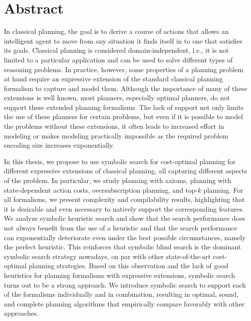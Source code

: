 \thispagestyle{empty}
\chapter*{Abstract}

In classical planning, the goal is to derive a course of actions that allows an intelligent agent to move from any situation it finds itself in to one that satisfies its goals.
Classical planning is considered domain-independent, i.e., it is not limited to a particular application and can be used to solve different types of reasoning problems.
In practice, however, some properties of a planning problem at hand require an expressive extension of the standard classical planning formalism to capture and model them. 
Although the importance of many of these extensions is well known, most planners, especially optimal planners, do not support these extended planning formalisms. 
The lack of support not only limits the use of these planners for certain problems, but even if it is possible to model the problems without these extensions, it often leads to increased effort in modeling or makes modeling practically impossible as the required problem encoding size increases exponentially.

In this thesis, we propose to use symbolic search for cost-optimal planning for different expressive extensions of classical planning, all capturing different aspects of the problem.
In particular, we study planning with axioms, planning with state-dependent action costs, oversubscription planning, and top-$k$ planning. 
For all formalisms, we present complexity and compilability results, highlighting that it is desirable and even necessary to natively support the corresponding features.
We analyze symbolic heuristic search and show that the search performance does not always benefit from the use of a heuristic and that the search performance can exponentially deteriorate even under the best possible circumstances, namely the perfect heuristic.
This reinforces that symbolic blind search is the dominant symbolic search strategy nowadays, on par with other state-of-the-art cost-optimal planning strategies.
Based on this observation and the lack of good heuristics for planning formalisms with expressive extensions, symbolic search turns out to be a strong approach.
We introduce symbolic search to support each of the formalisms individually and in combination, resulting in optimal, sound, and complete planning algorithms that empirically compare favorably with other approaches.
